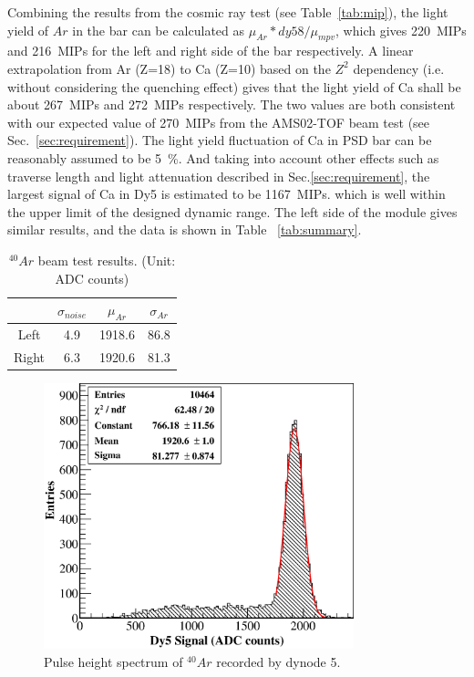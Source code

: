 \documentclass[preprint, times]{elsarticle}
\begin{document}
 Combining the results from the cosmic ray test (see Table~\ref{tab:mip}), the light yield of $Ar$ in the bar can be calculated as ${\mu_{Ar}*dy58}/{\mu_{mpv}}$, which gives \SI{220}{MIPs} and \SI{216}{MIPs} for the left and right side of the bar respectively.
 A linear extrapolation from Ar (Z=18) to Ca (Z=10) based on the $Z^2$ dependency (i.e. without considering the quenching effect) gives that the light yield of Ca shall be about \SI{267}{MIPs} and \SI{272}{MIPs} respectively.
 The two values are both consistent with our expected value of \SI{270}{MIPs} from the AMS02-TOF beam test (see Sec.~\ref{sec:requirement}). 
 The light yield fluctuation of Ca in PSD bar can be reasonably assumed to be \SI{5}{\percent}.
 And taking into account other effects such as traverse length and light attenuation described in Sec.\ref{sec:requirement}, the largest signal of Ca in Dy5 is estimated to be \SI{1167}{MIPs}.
 which is well within the upper limit of the designed dynamic range. The left side of the module gives similar results, and the data is shown in Table ~\ref{tab:summary}.

\begin{table}\footnotesize
	\centering
	\caption{$^{40}{Ar}$ beam test results. (Unit: ADC counts)}
	\label{tab:ion}
	\begin{tabulary}{80mm}{CCCC}
		\toprule
		& $\sigma_{noise}$ & $\mu_{Ar}$ & $\sigma_{Ar}$\\
		\midrule
		Left  & 4.9 & 1918.6 & 86.8 \\
		Right & 6.3 & 1920.6 & 81.3 \\
		\bottomrule
	\end{tabulary}
\end{table}

\begin{figure}
 \centering
 \includegraphics[width=90mm]{Ar}
\caption{Pulse height spectrum of $^{40}Ar$ recorded by dynode 5.}
\label{fig:Ar}
\end{figure}
\end{document}
